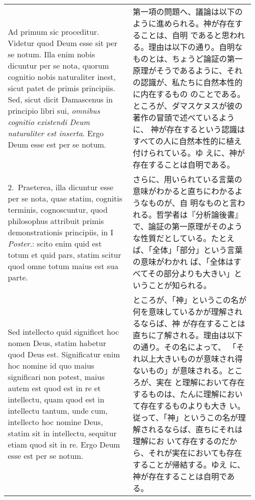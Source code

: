\documentclass[10pt]{jsarticle}
\begin{document}
\begin{longtable}{p{21em}p{21em}}

{\huge A}{\sc d primum sic proceditur}. Videtur quod Deum esse sit per
se notum. Illa enim nobis dicuntur per se nota, quorum cognitio nobis
naturaliter inest, sicut patet de primis principiis. Sed, sicut dicit
Damascenus in principio libri sui, {\it omnibus cognitio existendi
Deum naturaliter est inserta}. Ergo Deum esse est per se notum.

&

第一項の問題へ、議論は以下のように進められる。神が存在することは、自明
であると思われる。理由は以下の通り。自明なものとは、ちょうど論証の第一
原理がそうであるように、それの認識が、私たちに自然本性的に内在するもの
のことである。ところが、ダマスケヌスが彼の著作の冒頭で述べているように、
神が存在するという認識はすべての人に自然本性的に植え付けられている。ゆ
えに、神が存在することは自明である。

\\

2.~{\sc Praeterea}, illa dicuntur esse per se nota,
quae statim, cognitis terminis, cognoscuntur, quod philosophus attribuit
primis demonstrationis principiis, in I {\it Poster}.: scito enim quid est
totum et quid pars, statim scitur quod omne totum maius est sua
parte. 

&

さらに、用いられている言葉の意味がわかると直ちにわかるようなものが、自
明なものと言われる。哲学者は『分析論後書』で、論証の第一原理がそのよう
な性質だとしている。たとえば、「全体」「部分」という言葉の意味がわかれ
ば、「全体はすべてその部分よりも大きい」ということが知られる。

\\

Sed intellecto quid significet hoc nomen Deus, statim habetur quod
Deus est. Significatur enim hoc nomine id quo maius significari non
potest, maius autem est quod est in re et intellectu, quam quod est in
intellectu tantum, unde cum, intellecto hoc nomine Deus, statim sit in
intellectu, sequitur etiam quod sit in re. Ergo Deum esse est per se
notum.

&

ところが、「神」というこの名が何を意味しているかが理解されるならば、神
が存在することは直ちに了解される。理由は以下の通り。その名によって、
「それ以上大きいものが意味され得ないもの」が意味される。ところが、実在
と理解において存在するものは、たんに理解において存在するものよりも大き
い。従って、「神」というこの名が理解されるならば、直ちにそれは理解にお
いて存在するのだから、それが実在においても存在することが帰結する。ゆえ
に、神が存在することは自明である。


\end{longtable}
\end{document}
